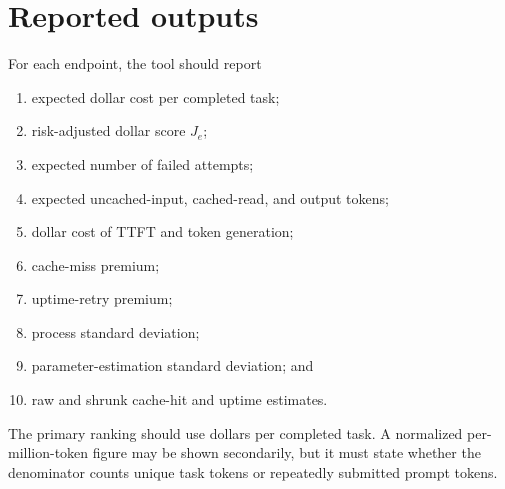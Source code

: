 \documentclass[11pt]{article}
\begin{document}
\section{Reported outputs}

For each endpoint, the tool should report
\begin{enumerate}[nosep]
  \item expected dollar cost per completed task;
  \item risk-adjusted dollar score $J_e$;
  \item expected number of failed attempts;
  \item expected uncached-input, cached-read, and output tokens;
  \item dollar cost of TTFT and token generation;
  \item cache-miss premium;
  \item uptime-retry premium;
  \item process standard deviation;
  \item parameter-estimation standard deviation; and
  \item raw and shrunk cache-hit and uptime estimates.
\end{enumerate}

The primary ranking should use dollars per completed task. A normalized
per-million-token figure may be shown secondarily, but it must state whether the
denominator counts unique task tokens or repeatedly submitted prompt tokens.
\end{document}
